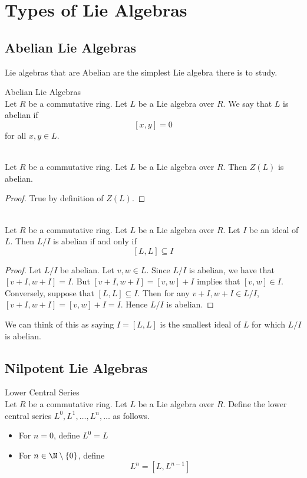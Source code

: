 \documentclass[a4paper]{article}
\begin{document}
\pagebreak
\section{Types of Lie Algebras}
\subsection{Abelian Lie Algebras}
Lie algebras that are Abelian are the simplest Lie algebra there is to study. 

\begin{defn}{Abelian Lie Algebras}{}\\
Let $R$ be a commutative ring. Let $L$ be a Lie algebra over $R$. We say that $L$ is abelian if $$[x,y]=0$$ for all $x,y\in L$. 
\end{defn}

\begin{lmm}{}{}\\
Let $R$ be a commutative ring. Let $L$ be a Lie algebra over $R$. Then $Z(L)$ is abelian. 
\begin{proof}
True by definition of $Z(L)$. 
\end{proof}
\end{lmm}

\begin{lmm}{}{}\\
Let $R$ be a commutative ring. Let $L$ be a Lie algebra over $R$. Let $I$ be an ideal of $L$. Then $L/I$ is abelian if and only if $$[L,L]\subseteq I$$ 
\begin{proof}
Let $L/I$ be abelian. Let $v,w\in L$. Since $L/I$ is abelian, we have that $[v+I,w+I]=I$. But $[v+I,w+I]=[v,w]+I$ implies that $[v,w]\in I$. Conversely, suppose that $[L,L]\subseteq I$. Then for any $v+I,w+I\in L/I$, $[v+I,w+I]=[v,w]+I=I$. Hence $L/I$ is abelian. 
\end{proof}
\end{lmm}

We can think of this as saying $I=[L,L]$ is the smallest ideal of $L$ for which $L/I$ is abelian. 

\subsection{Nilpotent Lie Algebras}
\begin{defn}{Lower Central Series}{}\\
Let $R$ be a commutative ring. Let $L$ be a Lie algebra over $R$. Define the lower central series $L^0,L^1,\dots,L^n,\dots$ as follows. 
\begin{itemize}
\item For $n=0$, define $L^0=L$
\item For $n\in\N\setminus\{0\}$, define $$L^n=[L,L^{n-1}]$$
\end{itemize}
\end{defn}
\end{document}
